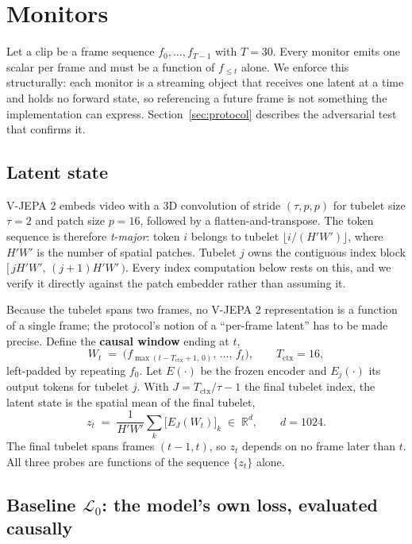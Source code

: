 \section{Monitors}
\label{sec:method}

Let a clip be a frame sequence $f_0,\dots,f_{T-1}$ with $T=30$. Every monitor
emits one scalar per frame and must be a function of $f_{\leq t}$ alone. We
enforce this structurally: each monitor is a streaming object that receives one
latent at a time and holds no forward state, so referencing a future frame is
not something the implementation can express. Section~\ref{sec:protocol}
describes the adversarial test that confirms it.

\subsection{Latent state}

V-JEPA 2 embeds video with a $3$D convolution of stride
$(\tau, p, p)$ for tubelet size $\tau=2$ and patch size $p=16$, followed by a
flatten-and-transpose. The token sequence is therefore \emph{t-major}: token $i$
belongs to tubelet $\lfloor i / (H'W') \rfloor$, where $H'W'$ is the number of
spatial patches. Tubelet $j$ owns the contiguous index block
$[\,jH'W',\,(j{+}1)H'W'\,)$. Every index computation below rests on this, and we
verify it directly against the patch embedder rather than assuming it.

Because the tubelet spans two frames, no V-JEPA 2 representation is a function
of a single frame; the protocol's notion of a ``per-frame latent'' has to be
made precise. Define the \textbf{causal window} ending at $t$,
\begin{equation}
W_t \;=\; \bigl(f_{\max(t-T_{\mathrm{ctx}}+1,\,0)},\,\dots,\,f_t\bigr),
\qquad T_{\mathrm{ctx}} = 16,
\end{equation}
left-padded by repeating $f_0$. Let $E(\cdot)$ be the frozen encoder and
$E_j(\cdot)$ its output tokens for tubelet $j$. With
$J = T_{\mathrm{ctx}}/\tau - 1$ the final tubelet index, the latent state is the
spatial mean of the final tubelet,
\begin{equation}
z_t \;=\; \frac{1}{H'W'} \sum_{k} \bigl[E_J(W_t)\bigr]_k \;\in\; \mathbb{R}^{d},
\qquad d = 1024 .
\end{equation}
The final tubelet spans frames $(t{-}1, t)$, so $z_t$ depends on no frame later
than $t$. All three probes are functions of the sequence $\{z_t\}$ alone.

\subsection{Baseline \texorpdfstring{$\mathcal{L}_0$}{L0}: the model's own loss,
evaluated causally}


